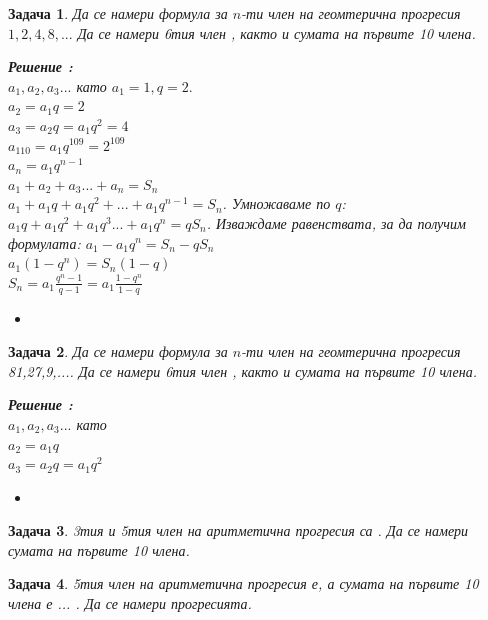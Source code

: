 \documentclass{article}
\newtheorem{problem}{Задача}
\newcounter{solution}
\newcommand\solution{%
	\stepcounter{solution}%
	\textbf{Решение :}\\%
}
\begin{document}
\begin{problem}
	Да се намери формула за $n$-ти член на геомтерична прогресия $1,2,4,8,...$ Да се намери 6тия член , както и сумата на първите 10 члена.
	
		\solution  $a_1, a_2, a_3 ... $ като $ a_1 = 1, q = 2.$ \\
	$a_2 = a_1 q = 2  $ \\
	$a_3 = a_2 q = a_1 q^2 = 4 $ \\
	$a_{110} = a_1q^{109} = 2^{109} $ \\
	$a_n = a_1 q^{n-1}$ \\
	
	\noindent
	$a_1 + a_2 + a_3 ... + a_n = S_n $ \\
	$a_1 + a_1q + a_1q^2 + ... + a_1q^{n-1} = S_n $. Умножаваме по $q$: \\
	$a_1q + a_1q^2 + a_1q^3 ... + a_1q^n = qS_n $. Изваждаме равенствата, за да получим формулата:
	$a_1 - a_1 q^n  = S_n - qS_n$ \\
	$a_1(1-q^n)  = S_n(1-q) $ \\
	
	
	$S_n = a_1 \frac{q^n-1}{q-1} =  a_1 \frac{1-q^n}{1-q} $
	
	
	\begin{itemize}
		\item 
		
	\end{itemize}
\end{problem}



\begin{problem}
	Да се намери формула за $n$-ти член на геомтерична прогресия 81,27,9,.... Да се намери 6тия член , както и сумата на първите 10 члена.
	
	\solution  $a_1, a_2, a_3 ... $ като \\
	$a_2 = a_1 q $ \\
	$a_3 = a_2 q = a_1 q^2 $ \\
	\begin{itemize}
		\item 
		
	\end{itemize}
\end{problem}


\begin{problem}
	3тия и 5тия член на аритметична прогресия са . Да се намери сумата на първите 10 члена.
\end{problem}


\begin{problem}
	5тия член на аритметична прогресия е, а сумата на първите 10 члена е ... . Да се намери прогресията.
\end{problem}
\end{document}
